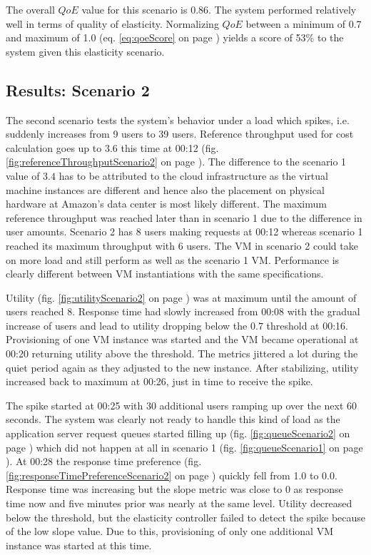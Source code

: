 \documentclass[english]{tktltiki2}
\theoremstyle{definition}
\theoremstyle{remark}
\begin{document}
The overall $QoE$ value for this scenario is $0.86$. The system performed
relatively well in terms of quality of elasticity. Normalizing $QoE$ between a
minimum of 0.7 and maximum of 1.0 (eq. \ref{eq:qoeScore} on page
\pageref{eq:qoeScore}) yields a score of 53\% to the system given this
elasticity scenario.

\subsection{Results: Scenario 2}

The second scenario tests the system's behavior under a load which spikes, i.e.
suddenly increases from 9 users to 39 users. Reference throughput used for cost
calculation goes up to $3.6$ this time at 00:12 (fig.
\ref{fig:referenceThroughputScenario2} on page
\pageref{fig:referenceThroughputScenario2}). The difference to the scenario 1 value
of $3.4$ has to be attributed to the cloud infrastructure as the virtual machine
instances are different and hence also the placement on physical hardware at
Amazon's data center is most likely different. The maximum reference throughput
was reached later than in scenario 1 due to the difference in user amounts.
Scenario 2 has 8 users making requests at 00:12 whereas scenario 1 reached its
maximum throughput with 6 users. The VM in scenario 2 could take on more load and still perform as well as the scenario 1 VM. Performance is clearly different
between VM instantiations with the same specifications.

Utility (fig. \ref{fig:utilityScenario2} on page \pageref{fig:utilityScenario2})
was at maximum until the amount of users reached 8. Response time had slowly
increased from 00:08 with the gradual increase of users and lead to utility
dropping below the $0.7$ threshold at 00:16. Provisioning of one VM instance was
started and the VM became operational at 00:20 returning utility above the
threshold. The metrics jittered a lot during the quiet period again as they
adjusted to the new instance. After stabilizing, utility increased back to
maximum at 00:26, just in time to receive the spike.

The spike started at 00:25 with 30 additional users ramping up over the next 60
seconds. The system was clearly not ready to handle this kind of load as the
application server request queues started filling up (fig.
\ref{fig:queueScenario2} on page \pageref{fig:queueScenario2}) which did not
happen at all in scenario 1 (fig. \ref{fig:queueScenario1} on page
\pageref{fig:queueScenario1}). At 00:28 the response time preference (fig.
\ref{fig:responseTimePreferenceScenario2} on page
\pageref{fig:responseTimePreferenceScenario2}) quickly fell from 1.0 to 0.0.
Response time was increasing but the slope metric was close to 0 as response
time now and five minutes prior was nearly at the same level. Utility decreased
below the threshold, but the elasticity controller failed to detect the spike
because of the low slope value. Due to this, provisioning of only one additional
VM instance was started at this time.
\end{document}

